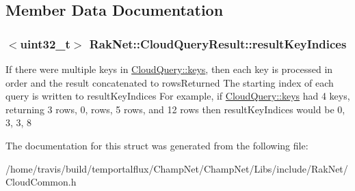 \subsection{Member Data Documentation}
\hypertarget{struct_rak_net_1_1_cloud_query_result_a75b780f5d71d00177effa21cc4f7a670}{
\subsubsection[{result\-Key\-Indices}]{$<$uint32\-\_\-t$>$ Rak\-Net\-::\-Cloud\-Query\-Result\-::result\-Key\-Indices}}\label{struct_rak_net_1_1_cloud_query_result_a75b780f5d71d00177effa21cc4f7a670}
If there were multiple keys in \hyperlink{struct_rak_net_1_1_cloud_query_a3a01154505b9a605142a8c95235d75ea}{Cloud\-Query\-::keys}, then each key is processed in order and the result concatenated to rows\-Returned The starting index of each query is written to result\-Key\-Indices For example, if \hyperlink{struct_rak_net_1_1_cloud_query_a3a01154505b9a605142a8c95235d75ea}{Cloud\-Query\-::keys} had 4 keys, returning 3 rows, 0, rows, 5 rows, and 12 rows then result\-Key\-Indices would be 0, 3, 3, 8 

The documentation for this struct was generated from the following file\-:\begin{DoxyCompactItemize}
\item 
/home/travis/build/temportalflux/\-Champ\-Net/\-Champ\-Net/\-Libs/include/\-Rak\-Net/Cloud\-Common.\-h\end{DoxyCompactItemize}
